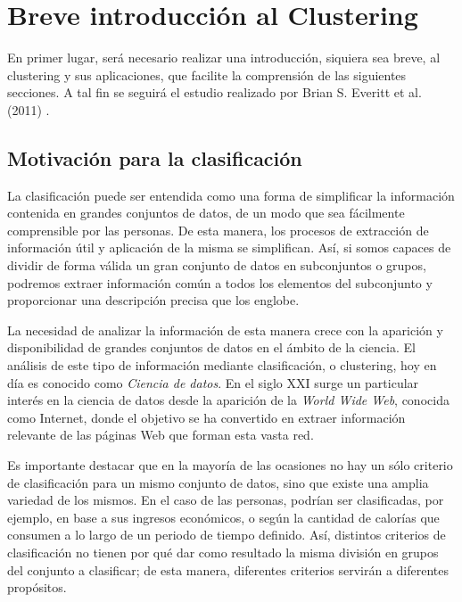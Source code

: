 
\chapter{Breve introducción al Clustering}\label{ch:Breve introducción al Clustering}

En primer lugar, será necesario realizar una introducción, siquiera sea breve, al clustering y sus aplicaciones, que facilite la comprensión de las siguientes secciones. A tal fin se seguirá el estudio realizado por Brian S. Everitt et al. (2011) \cite{ClusterAnalysis}.

\section{Motivación para la clasificación}

La clasificación puede ser entendida como una forma de simplificar la información contenida en grandes conjuntos de datos, de un modo que sea fácilmente comprensible por las personas. De esta manera, los procesos de extracción de información útil y aplicación de la misma se simplifican. Así, si somos capaces de dividir de forma válida un gran conjunto de datos en subconjuntos o grupos, podremos extraer información común a todos los elementos del subconjunto y proporcionar una descripción precisa que los englobe.

La necesidad de analizar la información de esta manera crece con la aparición y disponibilidad de grandes conjuntos de datos en el ámbito de la ciencia. El análisis de este tipo de información mediante clasificación, o clustering, hoy en día es conocido como \textit{Ciencia de datos}. En el siglo XXI surge un particular interés en la ciencia de datos desde la aparición de la \textit{World Wide Web}, conocida como Internet, donde el objetivo se ha convertido en extraer información relevante de las páginas Web que forman esta vasta red.

Es importante destacar que en la mayoría de las ocasiones no hay un sólo criterio de clasificación para un mismo conjunto de datos, sino que existe una amplia variedad de los mismos. En el caso de las personas, podrían ser clasificadas, por ejemplo, en base a sus ingresos económicos, o según la cantidad de calorías que consumen a lo largo de un periodo de tiempo definido. Así, distintos criterios de clasificación no tienen por qué dar como resultado la misma división en grupos del conjunto a clasificar; de esta manera, diferentes criterios servirán a diferentes propósitos.

